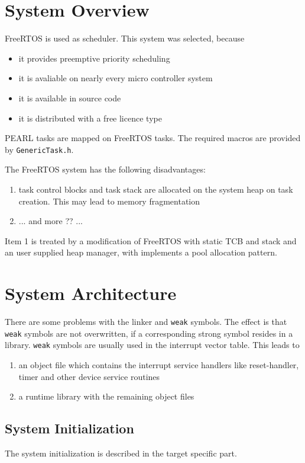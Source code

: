 \section{System Overview}
FreeRTOS is used as scheduler. This system was selected, because
\begin{itemize}
\item it provides preemptive priority scheduling
\item it is avaliable on nearly every micro controller system
\item it is available in source code
\item it is distributed with a free licence type
\end{itemize}

PEARL tasks are mapped on FreeRTOS tasks. The required macros
are provided by \texttt{GenericTask.h}.

The FreeRTOS system has the following disadvantages:
\begin{enumerate}
\item task control blocks and task stack are allocated on the system
   heap on task creation. This may lead to memory fragmentation
\item ... and more ?? ... 
\end{enumerate}

Item 1 is treated by a modification of FreeRTOS with static TCB and stack
and an user supplied heap manager, with implements a pool allocation pattern.

\section{System Architecture}
There are some problems with the linker and \texttt{weak} symbols.
The effect is that \texttt{weak} symbols are not overwritten, if
a corresponding strong symbol resides in a library.
\texttt{weak} symbols are usually used in the interrupt vector table.
This leads to
\begin{enumerate}
\item an object file which contains the interrupt service handlers like
   reset-handler, timer and other device service routines
\item a runtime library with the remaining object files
\end{enumerate}

\subsection{System Initialization}
The system initialization is described in the target specific part.

